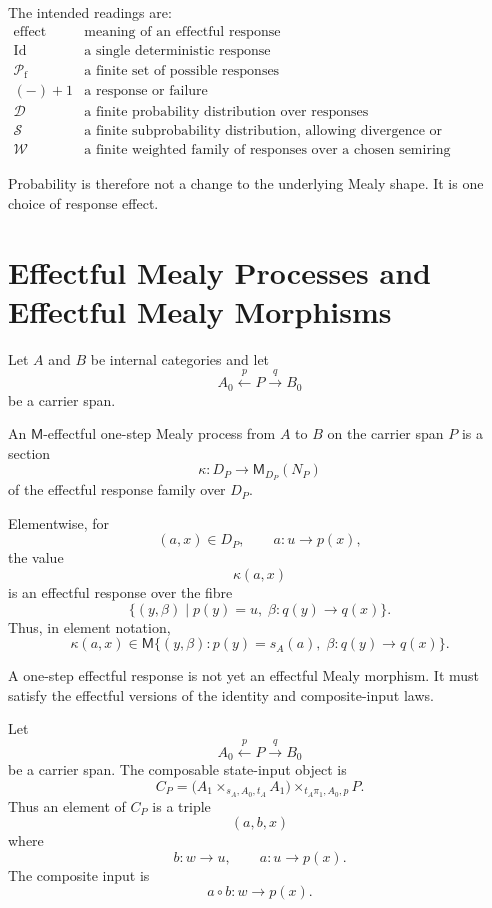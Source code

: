 The intended readings are:
\[
\begin{array}{c|l}
\text{effect} & \text{meaning of an effectful response}\\
\hline
\mathrm{Id} & \text{a single deterministic response}\\
\mathcal P_{\mathrm f} & \text{a finite set of possible responses}\\
(-)+1 & \text{a response or failure}\\
\mathcal D & \text{a finite probability distribution over responses}\\
\mathcal S & \text{a finite subprobability distribution, allowing divergence or nontermination}\\
\mathcal W & \text{a finite weighted family of responses over a chosen semiring}
\end{array}
\]

Probability is therefore not a change to the underlying Mealy shape.  It is one choice of response
effect.

\section{Effectful Mealy Processes and Effectful Mealy Morphisms}
\label{sec:effectful-mealy-morphisms}

Let \(A\) and \(B\) be internal categories and let
\[
A_0\xleftarrow{p}P\xrightarrow{q}B_0
\]
be a carrier span.

\begin{definition}
\label{def:effectful-one-step-mealy-process}
An \(\mathsf M\)-effectful one-step Mealy process from \(A\) to \(B\) on the carrier span \(P\)
is a section
\[
\kappa:
D_P
\longrightarrow
\mathsf M_{D_P}(N_P)
\]
of the effectful response family over \(D_P\).
\end{definition}

Elementwise, for
\[
(a,x)\in D_P,
\qquad
a:u\to p(x),
\]
the value
\[
\kappa(a,x)
\]
is an effectful response over the fibre
\[
\{(y,\beta)\mid p(y)=u,\;\beta:q(y)\to q(x)\}.
\]
Thus, in element notation,
\[
\boxed{
\kappa(a,x)
\in
\mathsf M
\{(y,\beta):p(y)=s_A(a),\;\beta:q(y)\to q(x)\}.
}
\]

A one-step effectful response is not yet an effectful Mealy morphism.  It must satisfy the
effectful versions of the identity and composite-input laws.

\begin{definition}
\label{def:composable-state-input-object}
Let
\[
A_0\xleftarrow{p}P\xrightarrow{q}B_0
\]
be a carrier span.  The composable state-input object is
\[
C_P
=
\bigl(A_1\times_{s_A,A_0,t_A}A_1\bigr)
\times_{t_A\pi_1,A_0,p}
P .
\]
Thus an element of \(C_P\) is a triple
\[
(a,b,x)
\]
where
\[
b:w\to u,
\qquad
a:u\to p(x).
\]
The composite input is
\[
a\circ b:w\to p(x).
\]
\end{definition}

